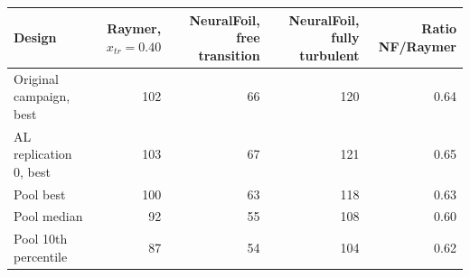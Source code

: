 \begin{tabular}{@{}lrrrr@{}}
\toprule
Design & Raymer, $x_{tr}=0.40$ & NeuralFoil, free transition & NeuralFoil, fully turbulent & Ratio NF/Raymer \\
\midrule
Original campaign, best & 102 & 66 & 120 & 0.64 \\
AL replication 0, best & 103 & 67 & 121 & 0.65 \\
Pool best & 100 & 63 & 118 & 0.63 \\
Pool median & 92 & 55 & 108 & 0.60 \\
Pool 10th percentile & 87 & 54 & 104 & 0.62 \\
\bottomrule
\end{tabular}
